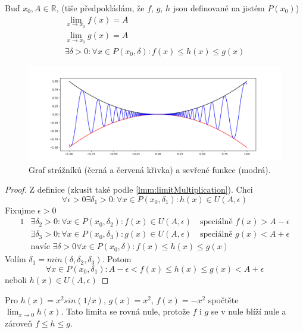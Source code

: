 \begin{theorem}[name=O strážnících, label=thm:patrolmen]
    Buď $x_0, A\in\mathbb{R}$, (tiše předpokládám, že $f$, $g$, $h$ jsou definované na jistém $P(x_0)$)
    \begin{gather}
        \lim_{x\to x_0}f(x)=A \\
        \lim_{x\to x_0}g(x)=A \\
        \exists\delta>0:\forall x\in P(x_0,\delta):f(x)\leq h(x)\leq g(x)
    \end{gather}
    \begin{figure}[ht!]
        \begin{center}
            \includegraphics[width=\textwidth,keepaspectratio]{../img/chapter2/patrolmen.png}
            \caption{Graf strážníků (černá a červená křivka) a sevřené funkce (modrá).}
        \end{center}
    \end{figure}\FloatBarrier
\end{theorem}
\begin{proof}
    Z definice (zkusit také podle \autoref{lmm:limitMultiplication}). Chci
    \begin{equation}
        \forall\epsilon>0\exists\delta_1>0:\forall x\in P(x_0,\delta_1):h(x)\in U(A,\epsilon)
    \end{equation}
    Fixujme $\epsilon>0$
    \begin{alignat}{1}
        &\exists\delta_2>0:\forall x\in P(x_0,\delta_2):f(x)\in U(A,\epsilon)
            \quad\text{speciálně }f(x)>A-\epsilon \\
        &\exists\delta_3>0:\forall x\in P(x_0,\delta_3):g(x)\in U(A,\epsilon)
            \quad\text{speciálně }g(x)<A+\epsilon \\
        &\text{navíc }\exists\delta>0\forall x\in P(x_0,\delta):f(x)\leq h(x)\leq g(x)
    \end{alignat}
    Volím $\delta_1=min(\delta,\delta_2,\delta_3)$. Potom
    \begin{equation}
        \forall x\in P(x_0,\delta_1):A-\epsilon<f(x)\leq h(x)\leq g(x)<A+\epsilon
    \end{equation}
    neboli $h(x)\in U(A,\epsilon)$
\end{proof}
\begin{example}
    Pro $h(x)=x^2sin(1/x)$, $g(x)=x^2$, $f(x)=-x^2$ spočtěte \\ $\lim_{x\to 0}h(x)$.
    Tato limita se rovná nule, protože $f$ i $g$ se v nule blíží nule a zároveň $f\leq h\leq g$.
\end{example}

